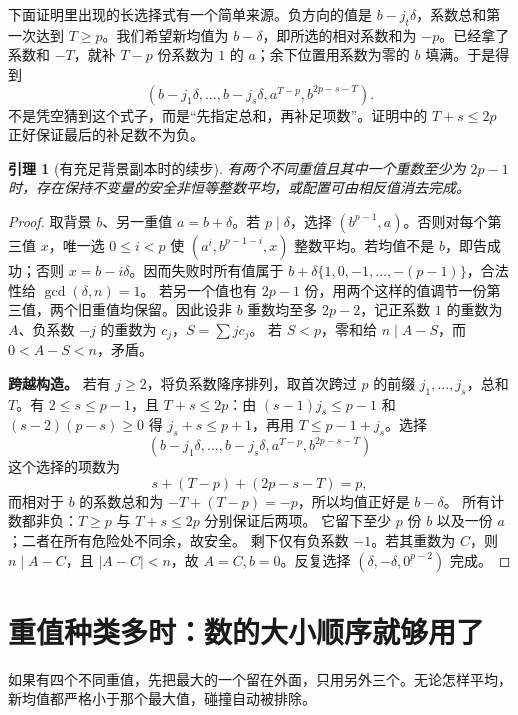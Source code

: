 \documentclass[11pt,a4paper,oneside,openany]{book}
\newtheorem{lemma}[theorem]{引理}
\theoremstyle{definition}
\numberwithin{equation}{chapter}
\begin{document}
下面证明里出现的长选择式有一个简单来源。负方向的值是 $b-j_t\delta$，系数总和第一次达到 $T\ge p$。我们希望新均值为 $b-\delta$，即所选的相对系数和为 $-p$。已经拿了系数和 $-T$，就补 $T-p$ 份系数为 $1$ 的 $a$；余下位置用系数为零的 $b$ 填满。于是得到
\[(b-j_1\delta,\ldots,b-j_s\delta,a^{T-p},b^{2p-s-T}).
\]
不是凭空猜到这个式子，而是“先指定总和，再补足项数”。证明中的 $T+s\le2p$ 正好保证最后的补足数不为负。
\begin{lemma}[有充足背景副本时的续步]\label{lem:background}
有两个不同重值且其中一个重数至少为 $2p-1$ 时，存在保持不变量的安全非恒等整数平均，或配置可由相反值消去完成。
\end{lemma}
\begin{proof}
取背景 $b$、另一重值 $a=b+\delta$。若 $p\mid\delta$，选择 $(b^{p-1},a)$。否则对每个第三值 $x$，唯一选 $0\le i<p$ 使 $(a^i,b^{p-1-i},x)$ 整数平均。若均值不是 $b$，即告成功；否则 $x=b-i\delta$。因而失败时所有值属于 $b+\delta\{1,0,-1,\ldots,-(p-1)\}$，合法性给 $\gcd(\delta,n)=1$。
若另一个值也有 $2p-1$ 份，用两个这样的值调节一份第三值，两个旧重值均保留。因此设非 $b$ 重数均至多 $2p-2$，记正系数 $1$ 的重数为 $A$、负系数 $-j$ 的重数为 $c_j$，$S=\sum j c_j$。
若 $S<p$，零和给 $n\mid A-S$，而 $0<A-S<n$，矛盾。\par\noindent\textbf{跨越构造。}
若有 $j\ge2$，将负系数降序排列，取首次跨过 $p$ 的前缀 $j_1,\ldots,j_s$，总和 $T$。有 $2\le s\le p-1$，且 $T+s\le2p$：由 $(s-1)j_s\le p-1$ 和 $(s-2)(p-s)\ge0$ 得 $j_s+s\le p+1$，再用 $T\le p-1+j_s$。选择
\[(b-j_1\delta,\ldots,b-j_s\delta,a^{T-p},b^{2p-s-T})
\]
这个选择的项数为
\[
s+(T-p)+(2p-s-T)=p,
\]
而相对于 $b$ 的系数总和为 $-T+(T-p)=-p$，所以均值正好是 $b-\delta$。
所有计数都非负：$T\ge p$ 与 $T+s\le2p$ 分别保证后两项。
它留下至少 $p$ 份 $b$ 以及一份 $a$；二者在所有危险处不同余，故安全。
剩下仅有负系数 $-1$。若其重数为 $C$，则 $n\mid A-C$，且 $|A-C|<n$，故 $A=C,b=0$。反复选择 $(\delta,-\delta,0^{p-2})$ 完成。
\end{proof}

\section{重值种类多时：数的大小顺序就够用了}
如果有四个不同重值，先把最大的一个留在外面，只用另外三个。无论怎样平均，新均值都严格小于那个最大值，碰撞自动被排除。
\end{document}

